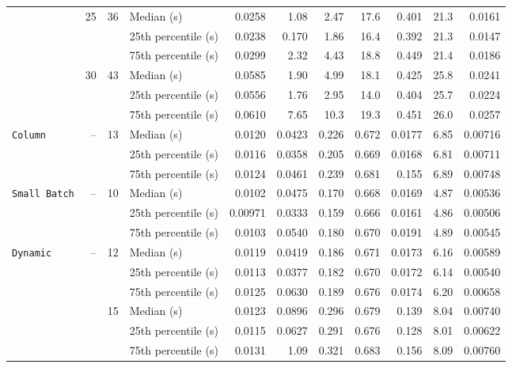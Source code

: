 \begin{table}[p]
\begin{threeparttable}
\begin{tabular}{@{}lrrlrrrrrrr@{}}
 & \multirow{3}{*}{25} & \multirow{3}{*}{36} & Median (s) & 0.0258 & 1.08 & 2.47 & 17.6 & 0.401 & 21.3 & 0.0161 \\
 & &  & 25th percentile (s) & 0.0238 & 0.170 & 1.86 & 16.4 & 0.392 & 21.3 & 0.0147 \\
 & &  & 75th percentile (s) & 0.0299 & 2.32 & 4.43 & 18.8 & 0.449 & 21.4 & 0.0186 \\
 & \multirow{3}{*}{30} & \multirow{3}{*}{43} & Median (s) & 0.0585 & 1.90 & 4.99 & 18.1 & 0.425 & 25.8 & 0.0241 \\
 & &  & 25th percentile (s) & 0.0556 & 1.76 & 2.95 & 14.0 & 0.404 & 25.7 & 0.0224 \\
 & &  & 75th percentile (s) & 0.0610 & 7.65 & 10.3 & 19.3 & 0.451 & 26.0 & 0.0257 \\
\midrule
\multirow{3}{*}{\texttt{Column}} & \multirow{3}{*}{--} & \multirow{3}{*}{13} & Median (s) & 0.0120 & 0.0423 & 0.226 & 0.672 & 0.0177 & 6.85 & 0.00716 \\
 & &  & 25th percentile (s) & 0.0116 & 0.0358 & 0.205 & 0.669 & 0.0168 & 6.81 & 0.00711 \\
 & &  & 75th percentile (s) & 0.0124 & 0.0461 & 0.239 & 0.681 & 0.155 & 6.89 & 0.00748 \\
\midrule
\multirow{3}{*}{\texttt{Small Batch}} & \multirow{3}{*}{--} & \multirow{3}{*}{10} & Median (s) & 0.0102 & 0.0475 & 0.170 & 0.668 & 0.0169 & 4.87 & 0.00536 \\
 & &  & 25th percentile (s) & 0.00971 & 0.0333 & 0.159 & 0.666 & 0.0161 & 4.86 & 0.00506 \\
 & &  & 75th percentile (s) & 0.0103 & 0.0540 & 0.180 & 0.670 & 0.0191 & 4.89 & 0.00545 \\
\midrule
\multirow{18}{*}{\texttt{Dynamic}} & \multirow{3}{*}{--} & \multirow{3}{*}{12} & Median (s) & 0.0119 & 0.0419 & 0.186 & 0.671 & 0.0173 & 6.16 & 0.00589 \\
 & &  & 25th percentile (s) & 0.0113 & 0.0377 & 0.182 & 0.670 & 0.0172 & 6.14 & 0.00540 \\
 & &  & 75th percentile (s) & 0.0125 & 0.0630 & 0.189 & 0.676 & 0.0174 & 6.20 & 0.00658 \\
 &  & \multirow{3}{*}{15} & Median (s) & 0.0123 & 0.0896 & 0.296 & 0.679 & 0.139 & 8.04 & 0.00740 \\
 & &  & 25th percentile (s) & 0.0115 & 0.0627 & 0.291 & 0.676 & 0.128 & 8.01 & 0.00622 \\
 & &  & 75th percentile (s) & 0.0131 & 1.09 & 0.321 & 0.683 & 0.156 & 8.09 & 0.00760 \\

\end{tabular}
\end{threeparttable}
\end{table}
